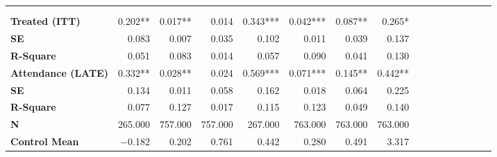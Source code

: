 \begin{tabular}{@{\extracolsep{5pt}}lrrrrrrrrrrrrrrr}
\toprule
&  &  &  &  &  &  &  \\
{\bf } &  &  &  &  &  &  &  \\
\hline
{\bf Treated (ITT)} & 0.202**\phantom{*} & 0.017**\phantom{*} & 0.014\phantom{***} & 0.343*** & 0.042*** & 0.087**\phantom{*} & 0.265*\phantom{**} \\
{\bf SE} & 0.083\phantom{***} & 0.007\phantom{***} & 0.035\phantom{***} & 0.102\phantom{***} & 0.011\phantom{***} & 0.039\phantom{***} & 0.137\phantom{***} \\
{\bf R-Square} & 0.051\phantom{***} & 0.083\phantom{***} & 0.014\phantom{***} & 0.057\phantom{***} & 0.090\phantom{***} & 0.041\phantom{***} & 0.130\phantom{***} \\
{\bf Attendance (LATE)} & 0.332**\phantom{*} & 0.028**\phantom{*} & 0.024\phantom{***} & 0.569*** & 0.071*** & 0.145**\phantom{*} & 0.442**\phantom{*} \\
{\bf SE} & 0.134\phantom{***} & 0.011\phantom{***} & 0.058\phantom{***} & 0.162\phantom{***} & 0.018\phantom{***} & 0.064\phantom{***} & 0.225\phantom{***} \\
{\bf R-Square} & 0.077\phantom{***} & 0.127\phantom{***} & 0.017\phantom{***} & 0.115\phantom{***} & 0.123\phantom{***} & 0.049\phantom{***} & 0.140\phantom{***} \\
{\bf N} & 265.000\phantom{***} & 757.000\phantom{***} & 757.000\phantom{***} & 267.000\phantom{***} & 763.000\phantom{***} & 763.000\phantom{***} & 763.000\phantom{***} \\
{\bf Control Mean} & $-$0.182\phantom{***} & 0.202\phantom{***} & 0.761\phantom{***} & 0.442\phantom{***} & 0.280\phantom{***} & 0.491\phantom{***} & 3.317\phantom{***} \\
\hline
\end{tabular}
